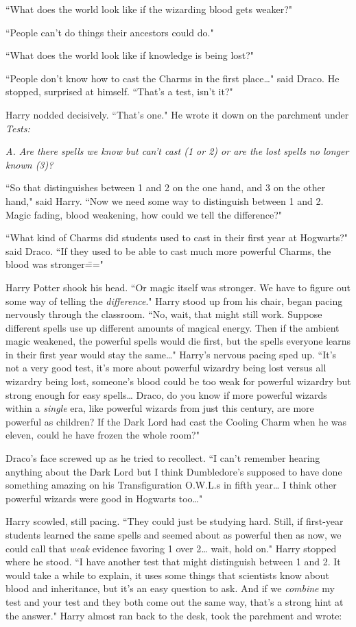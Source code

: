 ``What does the world look like if the wizarding blood gets weaker?"

``People can't do things their ancestors could do."

``What does the world look like if knowledge is being lost?"

``People don't know how to cast the Charms in the first place{\ldots}" said Draco. He stopped, surprised at himself. ``That's a test, isn't it?"

Harry nodded decisively. ``That's one." He wrote it down on the parchment under \emph{Tests:}

\emph{A. Are there spells we know but can't cast (1 or 2) or are the lost spells no longer known (3)?}

``So that distinguishes between 1 and 2 on the one hand, and 3 on the other hand," said Harry. ``Now we need some way to distinguish between 1 and 2. Magic fading, blood weakening, how could we tell the difference?"

``What kind of Charms did students used to cast in their first year at Hogwarts?" said Draco. ``If they used to be able to cast much more powerful Charms, the blood was stronger\==="

Harry Potter shook his head. ``Or magic itself was stronger. We have to figure out some way of telling the \emph{difference}." Harry stood up from his chair, began pacing nervously through the classroom. ``No, wait, that might still work. Suppose different spells use up different amounts of magical energy. Then if the ambient magic weakened, the powerful spells would die first, but the spells everyone learns in their first year would stay the same{\ldots}" Harry's nervous pacing sped up. ``It's not a very good test, it's more about powerful wizardry being lost versus all wizardry being lost, someone's blood could be too weak for powerful wizardry but strong enough for easy spells{\ldots} Draco, do you know if more powerful wizards within a \emph{single} era, like powerful wizards from just this century, are more powerful as children? If the Dark Lord had cast the Cooling Charm when he was eleven, could he have frozen the whole room?"

Draco's face screwed up as he tried to recollect. ``I can't remember hearing anything about the Dark Lord but I think Dumbledore's supposed to have done something amazing on his Transfiguration O.W.L.s in fifth year{\ldots} I think other powerful wizards were good in Hogwarts too{\ldots}"

Harry scowled, still pacing. ``They could just be studying hard. Still, if first-year students learned the same spells and seemed about as powerful then as now, we could call that \emph{weak} evidence favoring 1 over 2{\ldots} wait, hold on." Harry stopped where he stood. ``I have another test that might distinguish between 1 and 2. It would take a while to explain, it uses some things that scientists know about blood and inheritance, but it's an easy question to ask. And if we \emph{combine} my test and your test and they both come out the same way, that's a strong hint at the answer." Harry almost ran back to the desk, took the parchment and wrote:

